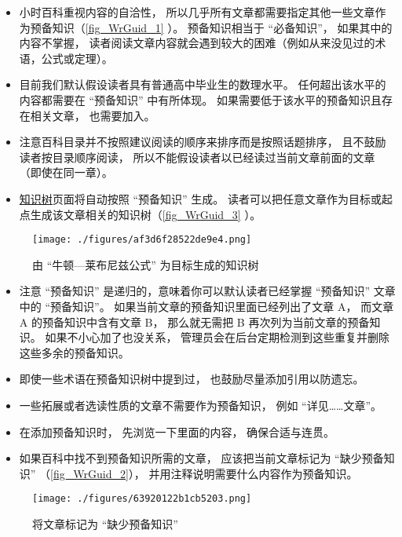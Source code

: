 \begin{itemize}
\item 小时百科重视内容的自洽性， 所以几乎所有文章都需要指定其他一些文章作为预备知识（\autoref{fig_WrGuid_1} ）。 预备知识相当于 “必备知识”， 如果其中的内容不掌握， 读者阅读文章内容就会遇到较大的困难（例如从来没见过的术语，公式或定理）。
\item 目前我们默认假设读者具有普通高中毕业生的数理水平。 任何超出该水平的内容都需要在 “预备知识” 中有所体现。 如果需要低于该水平的预备知识且存在相关文章， 也需要加入。
\item 注意百科目录并不按照建议阅读的顺序来排序而是按照话题排序， 且不鼓励读者按目录顺序阅读， 所以不能假设读者以已经读过当前文章前面的文章（即使在同一章）。
\item \href{https://wuli.wiki/tree/}{知识树}页面将自动按照 “预备知识” 生成。 读者可以把任意文章作为目标或起点生成该文章相关的知识树（\autoref{fig_WrGuid_3} ）。
\end{itemize}

\begin{figure}[ht]
\centering
\texttt{[image: ./figures/af3d6f28522de9e4.png]}
\caption{由 “牛顿—莱布尼兹公式” 为目标生成的知识树} \label{fig_WrGuid_3}
\end{figure}

\begin{itemize}
\item 注意 “预备知识” 是递归的，意味着你可以默认读者已经掌握 “预备知识” 文章中的 “预备知识”。 如果当前文章的预备知识里面已经列出了文章 A， 而文章 A 的预备知识中含有文章 B， 那么就无需把 B 再次列为当前文章的预备知识。 如果不小心加了也没关系， 管理员会在后台定期检测到这些重复并删除这些多余的预备知识。
\item 即使一些术语在预备知识树中提到过， 也鼓励尽量添加引用以防遗忘。
\item 一些拓展或者选读性质的文章不需要作为预备知识， 例如 “详见……文章”。
\item 在添加预备知识时， 先浏览一下里面的内容， 确保合适与连贯。
\item 如果百科中找不到预备知识所需的文章， 应该把当前文章标记为 “缺少预备知识” （\autoref{fig_WrGuid_2}）， 并用注释说明需要什么内容作为预备知识。
\end{itemize}

\begin{figure}[ht]
\centering
\texttt{[image: ./figures/63920122b1cb5203.png]}
\caption{将文章标记为 “缺少预备知识”} \label{fig_WrGuid_2}
\end{figure}

